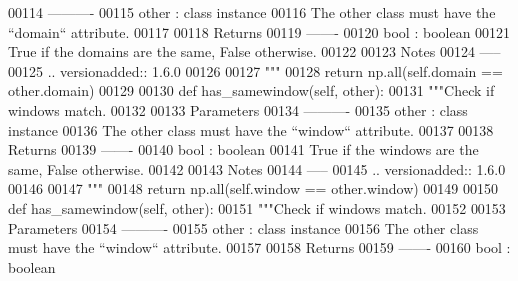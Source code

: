 \begin{DoxyCode}
{00114 \textcolor{stringliteral}{        ----------}
00115 \textcolor{stringliteral}{        other : class instance}
00116 \textcolor{stringliteral}{            The other class must have the ``domain`` attribute.}
00117 \textcolor{stringliteral}{}
00118 \textcolor{stringliteral}{        Returns}
00119 \textcolor{stringliteral}{        -------}
00120 \textcolor{stringliteral}{        bool : boolean}
00121 \textcolor{stringliteral}{            True if the domains are the same, False otherwise.}
00122 \textcolor{stringliteral}{}
00123 \textcolor{stringliteral}{        Notes}
00124 \textcolor{stringliteral}{        -----}
00125 \textcolor{stringliteral}{        .. versionadded:: 1.6.0}
00126 \textcolor{stringliteral}{}
00127 \textcolor{stringliteral}{        """}
00128 \textcolor{stringliteral}{        return np.all(self.domain == other.domain)}
00129 \textcolor{stringliteral}{}
00130 \textcolor{stringliteral}{    def has\_samewindow(self, other):}
00131 \textcolor{stringliteral}{        """Check if windows match.}
00132 \textcolor{stringliteral}{}
00133 \textcolor{stringliteral}{        Parameters}
00134 \textcolor{stringliteral}{        ----------}
00135 \textcolor{stringliteral}{        other : class instance}
00136 \textcolor{stringliteral}{            The other class must have the ``window`` attribute.}
00137 \textcolor{stringliteral}{}
00138 \textcolor{stringliteral}{        Returns}
00139 \textcolor{stringliteral}{        -------}
00140 \textcolor{stringliteral}{        bool : boolean}
00141 \textcolor{stringliteral}{            True if the windows are the same, False otherwise.}
00142 \textcolor{stringliteral}{}
00143 \textcolor{stringliteral}{        Notes}
00144 \textcolor{stringliteral}{        -----}
00145 \textcolor{stringliteral}{        .. versionadded:: 1.6.0}
00146 \textcolor{stringliteral}{}
00147 \textcolor{stringliteral}{        """}
00148 \textcolor{stringliteral}{        return np.all(self.window == other.window)}
00149 \textcolor{stringliteral}{}
00150 \textcolor{stringliteral}{    def has\_samewindow(self, other):}
00151 \textcolor{stringliteral}{        """Check if windows match.}
00152 \textcolor{stringliteral}{}
00153 \textcolor{stringliteral}{        Parameters}
00154 \textcolor{stringliteral}{        ----------}
00155 \textcolor{stringliteral}{        other : class instance}
00156 \textcolor{stringliteral}{            The other class must have the ``window`` attribute.}
00157 \textcolor{stringliteral}{}
00158 \textcolor{stringliteral}{        Returns}
00159 \textcolor{stringliteral}{        -------}
00160 \textcolor{stringliteral}{        bool : boolean}
}
\end{DoxyCode}
